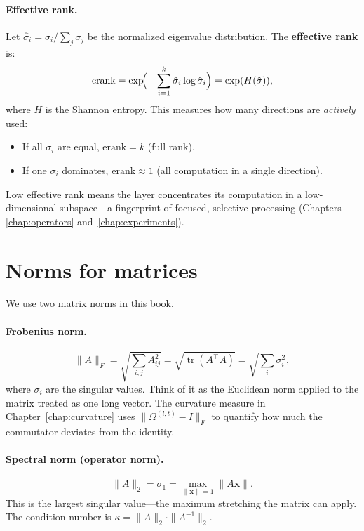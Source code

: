 \documentclass[11pt, twoside, openright]{memoir}
\begin{document}
\paragraph{Effective rank.}
Let $\hat\sigma_i = \sigma_i / \sum_j \sigma_j$ be the normalized
eigenvalue distribution.  The \textbf{effective rank} is:
\[
  \mathrm{erank} = \exp\!\Bigl(-\sum_{i=1}^{k} \hat\sigma_i
  \log \hat\sigma_i\Bigr) = \exp(H(\hat\sigma)),
\]
where $H$ is the Shannon entropy.  This measures how many directions are
\emph{actively} used:
\begin{itemize}[nosep]
  \item If all $\sigma_i$ are equal, $\mathrm{erank} = k$ (full rank).
  \item If one $\sigma_i$ dominates, $\mathrm{erank} \approx 1$ (all
    computation in a single direction).
\end{itemize}
Low effective rank means the layer concentrates its computation in a
low-dimensional subspace---a fingerprint of focused, selective processing
(Chapters \ref{chap:operators} and~\ref{chap:experiments}).

\section{Norms for matrices}

We use two matrix norms in this book.

\paragraph{Frobenius norm.}
\[
  \|A\|_F = \sqrt{\sum_{i,j} A_{ij}^2}
  = \sqrt{\operatorname{tr}(A^\top A)}
  = \sqrt{\sum_i \sigma_i^2},
\]
where $\sigma_i$ are the singular values.  Think of it as the Euclidean
norm applied to the matrix treated as one long vector.  The curvature
measure in Chapter~\ref{chap:curvature} uses $\|\Omega^{(l,t)} - I\|_F$
to quantify how much the commutator deviates from the identity.

\paragraph{Spectral norm (operator norm).}
\[
  \|A\|_2 = \sigma_1 = \max_{\|\mathbf{x}\|=1} \|A\mathbf{x}\|.
\]
This is the largest singular value---the maximum stretching the matrix can
apply.  The condition number is $\kappa = \|A\|_2 \cdot \|A^{-1}\|_2$.
\end{document}
